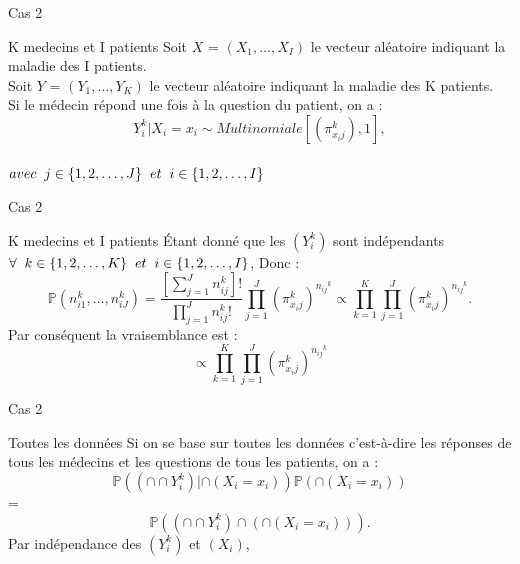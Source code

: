 \documentclass[11pt]{beamer}
\begin{document}
	\begin{frame}{Cas 2}
		\begin{block}{K medecins et I patients}
			Soit $X$ = $(X_1, \dots, X_I)$ le vecteur aléatoire indiquant la maladie des I patients.\\
			Soit $Y$ = $(Y_1, \dots, Y_K)$ le vecteur aléatoire indiquant la maladie des K patients.\\
			Si le médecin répond une fois à la question du patient, on a :
			\[Y_{i}^k | X_i=x_i \sim Multinomiale \left[(\pi_{x_ij}^k), 1\right],\]\\
			$avec\hspace{2mm}j \in \{1, 2, \dots,J\}\hspace{2mm} et\hspace{2mm} i \in \{1, 2, \dots,I\}$
			
		\end{block}
	\end{frame}	
	
	\begin{frame}{Cas 2}
		\begin{block}{K medecins et I patients}
			Étant donné que les $(Y_{i}^k)$ sont indépendants $ \forall\hspace{2mm}k \in \{1, 2, \dots,K\}\hspace{2mm} et\hspace{2mm} i \in \{1, 2, \dots,I\}$, Donc : \[\mathbb{P}\left(n_{i1}^k, \dots, n_{iJ}^k\right) = \frac{\left[\sum_{j=1}^{J} n_{ij}^k\right]!}{\prod_{j=1}^{J} n_{ij}^k !} \prod_{j=1}^{J} \left(\pi_{x_ij}^k\right)^{{n_{ij}}^{k}} \propto \prod_{k=1}^{K} \prod_{j=1}^{J} \left(\pi_{x_ij}^k\right)^{{n_{ij}}^{k}}.\]
			Par conséquent la vraisemblance est : \[\propto \prod_{k=1}^{K} \prod_{j=1}^{J} \left(\pi_{x_ij}^k\right)^{{n_{ij}}^{k}}\]
			
		\end{block}
	\end{frame}	
	
	\begin{frame}{Cas 2}
		\begin{block}{Toutes les données}
			Si on se base sur toutes les données c'est-à-dire les réponses de tous les médecins et les questions de tous les patients, on a :
			\[\mathbb{P} \left((\cap \cap Y_{i}^k) | \cap(X_i=x_i) \right) \mathbb{P}\left(\cap (X_i = x_i)\right) \] = \[\mathbb{P} \left((\cap \cap Y_{i}^k) \cap \left(\cap(X_i=x_i)\right)  \right).\]
			Par indépendance des $(Y_{i}^k)$ et $(X_i)$, 
			
		\end{block}
	\end{frame}	
	
\end{document}
